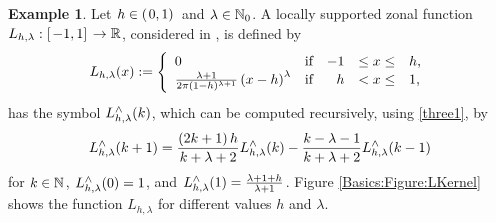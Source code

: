 \documentclass[11pt,a4paper,twoside,bibtotoc]{scrartcl}
\theoremstyle{plain}
\theoremstyle{definition}
\newtheorem{example}[theorem]{Example}
\theoremstyle{remark}
\numberwithin{equation}{section}
\numberwithin{table}{section}
\numberwithin{figure}{section}
\begin{document}
\begin{example}
  Let $h \in \left(\left.0,1\right)\right.$ and $\lambda \in \mathbb{N}_{0}$.
  A locally supported zonal function $L_{h,\lambda}:\left[\left.-1,1\right]\right.
  \rightarrow \mathbb{R}$, considered in \cite{Sc97}, is defined by
  \[
  \fun{L_{h,\lambda}}{x} := 
  \left\{\begin{array}{l@{\quad \text{if} \quad}rcl} 
      0 & -1 &\le x \le& h, \\
      \frac{\lambda+1}{2\pi(1-h)^{\lambda+1}}\paren{x-h}^{\lambda} &  h & <  x \le& 1,
    \end{array}\right.
  \]
  has the symbol $L_{h,\lambda}^{\wedge}{\hspace{-0.4ex}}\left(k\right)$, which can be computed
  recursively, using \eqref{three1}, by
  \[
  L_{h,\lambda}^{\wedge}{\hspace{-0.4ex}}\left(k+1\right) = \frac{\left(2k+1\right) h}{k+\lambda+2}
  L_{h,\lambda}^{\wedge}{\hspace{-0.4ex}}\left(k\right)   - \frac{k-\lambda-1}{k+\lambda+2}
  L_{h,\lambda}^{\wedge}{\hspace{-0.4ex}}\left(k-1\right)
  \]
  for $k\in \mathbb{N}$, $L_{h,\lambda}^{\wedge}{\hspace{-0.4ex}}\left(0\right) = 1$, and
  $L_{h,\lambda}^{\wedge}{\hspace{-0.4ex}}\left(1\right) = \frac{\lambda + 1 + h}{\lambda+1}$.
  Figure \ref{Basics:Figure:LKernel} shows the function $L_{h,\lambda}$ for
  different values $h$ and $\lambda$.
  \begin{figure}[tb]
    \centering
    \hfill
    \\
    \hfill

\end{figure}
\end{example}
\end{document}
